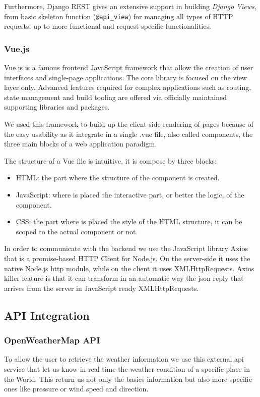 \documentclass[table, 12pt]{article}
\begin{document}
Furthermore, Django REST gives an extensive support in building \emph{Django Views}, from basic skeleton function (\texttt{@api\_view}) for managing all types of HTTP requests, up to more functional and request-specific functionalities.

\subsubsection{Vue.js}
\label{Vue}
Vue.js is a famous frontend JavaScript framework that allow the creation of user interfaces and single-page applications.
The core library is focused on the view layer only.
Advanced features required for complex applications such as routing, state management and build tooling are offered via officially maintained supporting libraries and packages.

We used this framework to build up the client-side rendering of pages because of the easy usability as it integrate in a single .vue file, also called components,
the three main blocks of a web application paradigm.

The structure of a Vue file is intuitive, it is compose by three blocks:
\begin{itemize}
    \item HTML: the part where the structure of the component is created.
    \item JavaScript: where is placed the interactive part, or better the logic, of the component.
    \item CSS: the part where is placed the style of the HTML structure, it can be scoped to the actual component or not.
\end{itemize}
In order to communicate with the backend we use the JavaScript library Axios that is a promise-based HTTP Client for Node.js.
On the server-side it uses the native Node.js http module, while on the client it uses XMLHttpRequests.
Axios killer feature is that it can transform in an automatic way the json reply that arrives from the server in JavaScript ready XMLHttpRequests.

\subsection{API Integration}
\subsubsection{OpenWeatherMap API}
To allow the user to retrieve the weather information we use this external api service that let us know in real time
the weather condition of a specific place in the World.
This return us not only the basics information but also more specific ones like pressure or wind speed and direction.
\end{document}
